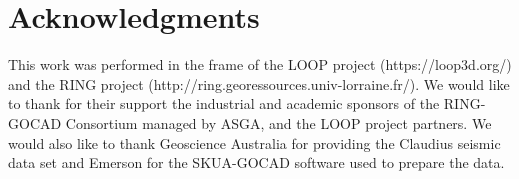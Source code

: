 \documentclass[final]{ring20}
\begin{document}
\section*{Acknowledgments}

This work was performed in the frame of the LOOP project (https://loop3d.org/) and the RING project (http://ring.georessources.univ-lorraine.fr/). We would like to thank for their support the industrial and academic sponsors of the RING-GOCAD Consortium managed by ASGA, and the LOOP project partners. We would also like to thank Geoscience Australia for providing the Claudius seismic data set and Emerson for the SKUA-GOCAD software used to prepare the data. 


\end{document}
